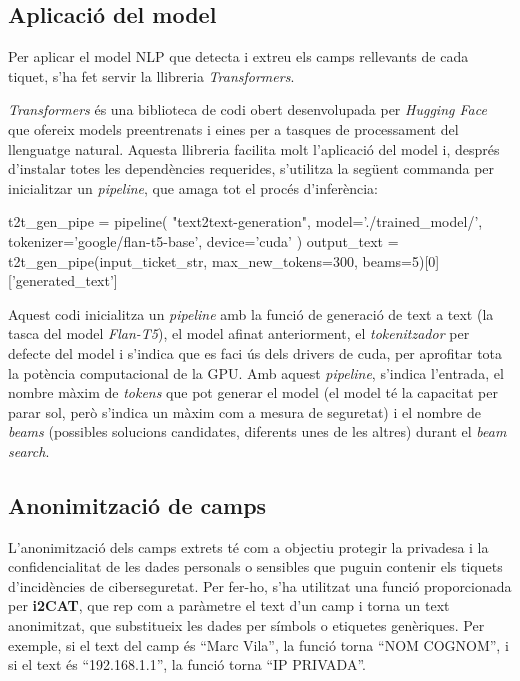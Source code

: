 \subsection{Aplicació del model}
Per aplicar el model NLP que detecta i extreu els camps rellevants de cada tiquet, s'ha fet servir la llibreria \textit{Transformers}.

\textit{Transformers} és una biblioteca de codi obert desenvolupada per \textit{Hugging Face} \cite{Hugging-Face} que ofereix models preentrenats i eines per a tasques de processament del llenguatge natural. Aquesta llibreria facilita molt l'aplicació del model i, després d'instalar totes les dependències requerides, s'utilitza la següent commanda per inicialitzar un \textit{pipeline}, que amaga tot el procés d'inferència:

\begin{python}
t2t_gen_pipe = pipeline(
     "text2text-generation",
     model='./trained_model/',
     tokenizer='google/flan-t5-base',
     device='cuda'
     )     
output_text = t2t_gen_pipe(input_ticket_str, max_new_tokens=300, beams=5)[0]['generated_text']
\end{python}

Aquest codi inicialitza un \textit{pipeline} amb la funció de generació de text a text (la tasca del model \textit{Flan-T5}), el model afinat anteriorment, el \textit{tokenitzador} per defecte del model i s'indica que es faci ús dels drivers de cuda, per aprofitar tota la potència computacional de la GPU. Amb aquest \textit{pipeline}, s'indica l'entrada, el nombre màxim de \textit{tokens} que pot generar el model (el model té la capacitat per parar sol, però s'indica un màxim com a mesura de seguretat) i el nombre de \textit{beams} (possibles solucions candidates, diferents unes de les altres) durant el \textit{beam search}.


\subsection{Anonimització de camps}
L'anonimització dels camps extrets té com a objectiu protegir la privadesa i la confidencialitat de les dades personals o sensibles que puguin contenir els tiquets d'incidències de ciberseguretat. Per fer-ho, s'ha utilitzat una funció proporcionada per \textbf{i2CAT}, que rep com a paràmetre el text d'un camp i torna un text anonimitzat, que substitueix les dades per símbols o etiquetes genèriques. Per exemple, si el text del camp és ``Marc Vila'', la funció torna ``NOM COGNOM'', i si el text és ``192.168.1.1'', la funció torna ``IP PRIVADA''.

